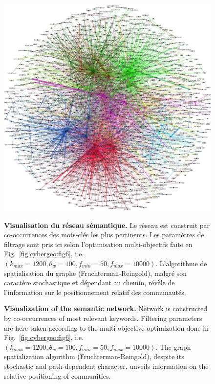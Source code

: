 \begin{figure}
\includegraphics[width=\linewidth]{Figures/Final/B-cybergeo-fig7.jpg}
\caption{\textbf{Visualization of the semantic network.} Network is constructed by co-occurrences of most relevant keywords. Filtering parameters are here taken according to the multi-objective optimization done in Fig.~\ref{fig:cybergeo:fig6}, i.e. $(k_{max}=1200,\theta_w=100,f_{min}=50,f_{max}=10000)$. The graph spatialization algorithm (Fruchterman-Reingold), despite its stochastic and path-dependent character, unveils information on the relative positioning of communities.\label{fig:cybergeo:fig7}}{\textbf{Visualisation du réseau sémantique.} Le réseau est construit par co-occurrences des mots-clés les plus pertinents. Les paramètres de filtrage sont pris ici selon l'optimisation multi-objectifs faite en Fig.~\ref{fig:cybergeo:fig6}, i.e. $(k_{max}=1200,\theta_w=100,f_{min}=50,f_{max}=10000)$. L'algorithme de spatialisation du graphe (Fruchterman-Reingold), malgré son caractère stochastique et dépendant au chemin, révèle de l'information sur le positionnement relatif des communautés.\label{fig:cybergeo:fig7}}
\end{figure}



